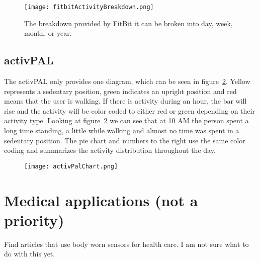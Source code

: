 \begin{figure}[h!]
	\centering
		\texttt{[image: fitbitActivityBreakdown.png]}
		\caption{\footnotesize The breakdown provided by FitBit it can be broken into day, week, month, or year.}
		\label{fig:fitbitActivityBreakdown}
\end{figure}

\subsection{activPAL}
\label{sec:activPALViz}
The activPAL only provides one diagram, which can be seen in figure~\ref{fig:activPalActivityBreakdown}. Yellow represents a sedentary position, green indicates an upright position and red means that the user is walking. If there is activity during an hour, the bar will rise and the activity will be color coded to either red or green depending on their activity type. Looking at figure~\ref{fig:activPalActivityBreakdown} we can see that at 10 AM the person spent a long time standing, a little while walking and almost no time was spent in a sedentary position. The pie chart and numbers to the right use the same color coding and summarizes the activity distribution throughout the day.

\begin{figure}[h!]
	\centering
		\texttt{[image: activPalChart.png]}
		\caption{\footnotesize }
		\label{fig:activPalActivityBreakdown}
\end{figure}

\section{Medical applications (not a priority)}
Find articles that use body worn sensors for health care. I am not sure what to do with this yet.
